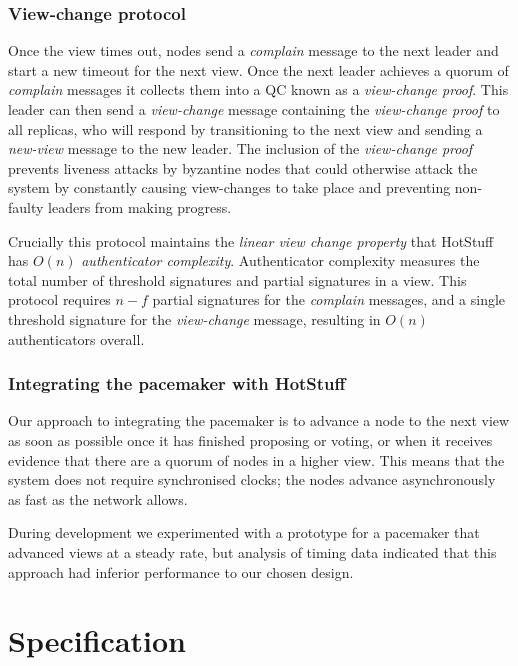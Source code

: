 \subsubsection{View-change protocol} \label{viewchange}

Once the view times out, nodes send a \textit{complain} message to the next leader and start a new timeout for the next view. Once the next leader achieves a quorum of \textit{complain} messages it collects them into a QC known as a \textit{view-change proof}. This leader can then send a \textit{view-change} message containing the \textit{view-change proof} to all replicas, who will respond by transitioning to the next view and sending a \textit{new-view} message to the new leader. The inclusion of the \textit{view-change proof} prevents liveness attacks by byzantine nodes that could otherwise attack the system by constantly causing view-changes to take place and preventing non-faulty leaders from making progress.

Crucially this protocol maintains the \textit{linear view change property} that HotStuff has $O(n)$ \textit{authenticator complexity}. Authenticator complexity measures the total number of threshold signatures and partial signatures in a view. This protocol requires $n - f$ partial signatures for the \textit{complain} messages, and a single threshold signature for the \textit{view-change} message, resulting in $O(n)$ authenticators overall.

\subsubsection{Integrating the pacemaker with HotStuff}

Our approach to integrating the pacemaker is to advance a node to the next view as soon as possible once it has finished proposing or voting, or when it receives evidence that there are a quorum of nodes in a higher view. This means that the system does not require synchronised clocks; the nodes advance asynchronously as fast as the network allows.

During development we experimented with a prototype for a pacemaker that advanced views at a steady rate, but analysis of timing data indicated that this approach had inferior performance to our chosen design.

\section{Specification} \label{spec}

